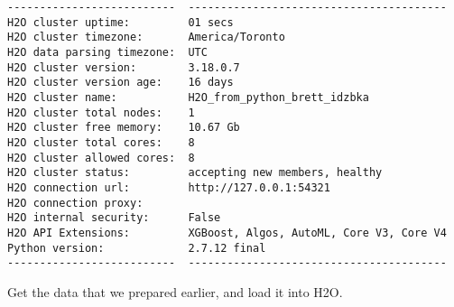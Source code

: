 \documentclass[11pt]{article}
\begin{document}
    
    \begin{verbatim}
--------------------------  ----------------------------------------
H2O cluster uptime:         01 secs
H2O cluster timezone:       America/Toronto
H2O data parsing timezone:  UTC
H2O cluster version:        3.18.0.7
H2O cluster version age:    16 days
H2O cluster name:           H2O_from_python_brett_idzbka
H2O cluster total nodes:    1
H2O cluster free memory:    10.67 Gb
H2O cluster total cores:    8
H2O cluster allowed cores:  8
H2O cluster status:         accepting new members, healthy
H2O connection url:         http://127.0.0.1:54321
H2O connection proxy:
H2O internal security:      False
H2O API Extensions:         XGBoost, Algos, AutoML, Core V3, Core V4
Python version:             2.7.12 final
--------------------------  ----------------------------------------
    \end{verbatim}

    
    Get the data that we prepared earlier, and load it into H2O.
\end{document}
